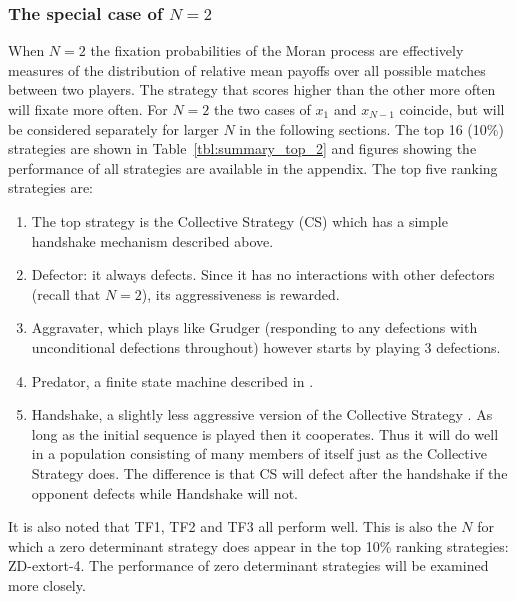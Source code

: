\documentclass[10pt,letterpaper]{article}
\begin{document}
\subsubsection*{The special case of \(N=2\)}

When $N=2$ the fixation probabilities of the Moran process are effectively
measures of the distribution of  relative mean payoffs over all possible matches
between two players. The strategy that scores higher than the other more often
will fixate more often. For \(N=2\) the two cases of \(x_1\) and \(x_{N-1}\)
coincide, but will be considered separately for larger \(N\) in the following
sections.  The top 16 (10\%) strategies are shown in
Table~\ref{tbl:summary_top_2} and figures showing the performance of all
strategies are available in the appendix.  The top five ranking strategies are:

\begin{enumerate}
    \item The top strategy is the Collective Strategy (CS) which has a simple
        handshake mechanism described above.
    \item Defector: it always defects. Since it has no interactions with other
        defectors (recall that \(N=2\)), its aggressiveness is rewarded.
    \item Aggravater, which plays like Grudger (responding to any
        defections with unconditional defections throughout) however starts by
        playing 3 defections.
    \item Predator, a finite state machine described in \cite{Ashlock2006}.
    \item Handshake, a slightly less aggressive version of the Collective
        Strategy \cite{Robson1990}. As long as the initial sequence is played
        then it cooperates. Thus it will do well in a population consisting of
        many members of itself just as the Collective Strategy does. The
        difference is that CS will defect after the handshake if the opponent
        defects while Handshake will not.
\end{enumerate}

It is also noted that TF1, TF2 and TF3 all perform well. This is also the \(N\)
for which a zero determinant strategy does appear in the top 10\% ranking
strategies: ZD-extort-4. The performance of zero determinant strategies will be
examined more closely.
\end{document}
